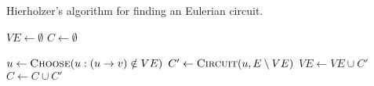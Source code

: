 
\begin{algorithm}[H]
  \caption{Hierholzer's algorithm for finding an Eulerian circuit.}
  \label{alg:eulerian-circuit-hierholzer}
  \begin{algorithmic}
    \State $VE \gets \emptyset$
    \State $C \gets \emptyset$

    \Statex
      \State $u \gets \Call{Choose}{u : (u \to v) \notin VE}$
      \State $C' \gets \Call{Circuit}{u, E \setminus VE}$
      \State $VE \gets VE \cup C'$
      \State $C \gets C \cup C'$
    \EndWhile
  \end{algorithmic}
\end{algorithm}
